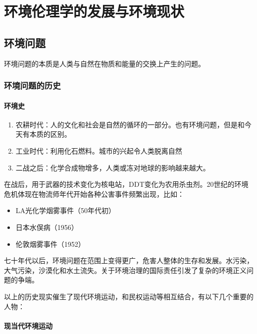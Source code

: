 \documentclass{ctexart}
\begin{document}
\section{环境伦理学的发展与环境现状}

\subsection{环境问题}

环境问题的本质是人类与自然在物质和能量的交换上产生的问题。

\subsubsection{环境问题的历史}

\paragraph{环境史}
\begin{enumerate}
    \item 农耕时代：人的文化和社会是自然的循环的一部分。也有环境问题，但是和今天有本质的区别。
    \item 工业时代：利用化石燃料。城市的兴起令人类脱离自然
    \item 二战之后：化学合成物增多，人类或冻对地球的影响越来越大。
\end{enumerate}

在战后，用于武器的技术变化为核电站，DDT变化为农用杀虫剂。20世纪的环境危机体现在物流师年代开始各种公害事件频繁出现，比如：

\begin{itemize}
    \item LA光化学烟雾事件（50年代初）
    \item 日本水俣病（1956）
    \item 伦敦烟雾事件（1952）
\end{itemize}

七十年代以后，环境问题在范围上变得更广，危害人整体的生存和发展。水污染，大气污染，沙漠化和水土流失。关于环境治理的国际责任引发了复杂的环境正义问题的争端。

以上的历史现实催生了现代环境运动，和民权运动等相互结合，有以下几个重要的人物：

\paragraph{现当代环境运动}
\end{document}
